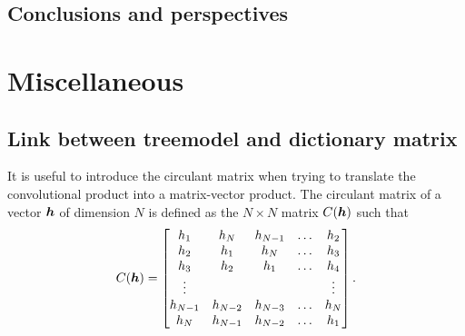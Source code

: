 \section{Conclusions and perspectives}



\clearpage
{}
\appendix

\chapter{Miscellaneous}


\section{Link between \gls{treemodel} and dictionary matrix}\label{sec_matrix_vs_tree} 

It is useful to introduce the circulant matrix when trying to translate the convolutional product into a matrix-vector product. The circulant matrix of a vector $\bm{h}$ of dimension $N$ is defined as the $N \times N$ matrix $C(\bm{h})$ such that
$$C(\bm{h}) = 
	\begin{bmatrix}
		h_1     & h_{N}   & h_{N-1} & \dots & h_{2} \\
		h_2     & h_{1}   & h_{N}   & \dots & h_{3} \\
		h_3     & h_{2}   & h_{1}   & \dots & h_{4} \\
		\vdots  &         &         &       & \vdots \\
		h_{N-1} & h_{N-2} & h_{N-3} & \dots & h_{N} \\
		h_N     & h_{N-1} & h_{N-2} & \dots & h_{1} \\
	\end{bmatrix}
.$$

